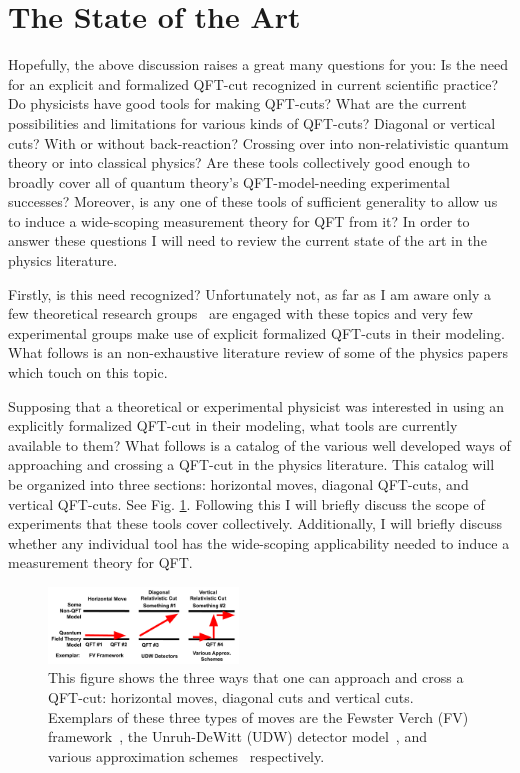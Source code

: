 \documentclass[12pt,prd,superscriptaddress,floatfix,amsmath,amssymb,amsfonts,nofootinbib]{revtex4-2}
\begin{document}
\section{The State of the Art}\label{StateOfTheArt}
Hopefully, the above discussion raises a great many questions for you: Is the need for an explicit and formalized QFT-cut recognized in current scientific practice? Do physicists have good tools for making QFT-cuts? What are the current possibilities and limitations for various kinds of QFT-cuts? Diagonal or vertical cuts? With or without back-reaction? Crossing over into non-relativistic quantum theory or into classical physics? Are these tools collectively good enough to broadly cover all of quantum theory's QFT-model-needing experimental successes? Moreover, is any one of these tools of sufficient generality to allow us to induce a wide-scoping measurement theory for QFT from it? In order to answer these questions I will need to review the current state of the art in the physics literature.

Firstly, is this need recognized? Unfortunately not, as far as I am aware only a few theoretical research groups~\cite{pologomez2021detectorbased,fewster1,fewster2,fewster3,Anastopoulos2022,TaleOfTwo,Ruep2021,JoseMariaEdu,BorstenJubbKells} are engaged with these topics and very few experimental groups make use of explicit formalized QFT-cuts in their modeling. What follows is an non-exhaustive literature review of some of the physics papers which touch on this topic.

Supposing that a theoretical or experimental physicist was interested in using an explicitly formalized QFT-cut in their modeling, what tools are currently available to them? What follows is a catalog of the various well developed ways of approaching and crossing a QFT-cut in the physics literature. This catalog will be organized into three sections: horizontal moves, diagonal QFT-cuts, and vertical QFT-cuts. See Fig. \ref{FigFVUDW}. Following this I will briefly discuss the scope of experiments that these tools cover collectively. Additionally, I will briefly discuss whether any individual tool has the wide-scoping applicability needed to induce a measurement theory for QFT.

\begin{figure}
\includegraphics[width=0.45\textwidth]{Figures/FVvsUDW.pdf}
\caption{This figure shows the three ways that one can approach and cross a QFT-cut: horizontal moves, diagonal cuts and vertical cuts. Exemplars of these three types of moves are the Fewster Verch (FV) framework~\cite{fewster1,fewster2,fewster3}, the Unruh-DeWitt (UDW) detector model~\cite{Unruh1976,BLHu2007, Brown2013, Hotta2020, Zeromode,TaleOfTwo,Adam,Valentini1991, Reznik2003, Pozas-Kerstjens:2015,Menicucci, Terno2016, Cosmo, Henderson2018,pologomez2021detectorbased}, and various approximation schemes~\cite{Rosaler,FlaminiaAchim} respectively.}\label{FigFVUDW}
\end{figure}
\end{document}
